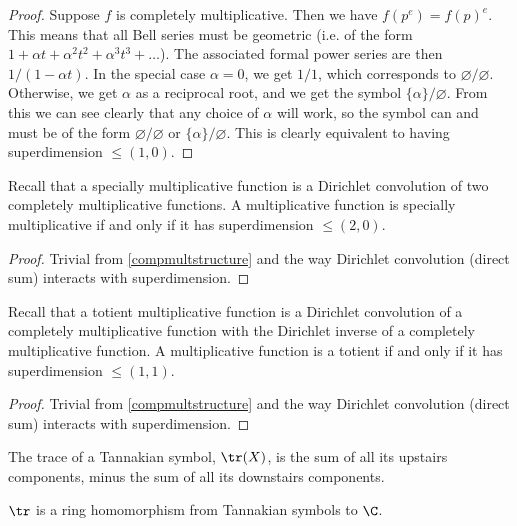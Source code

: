 \documentclass[a4paper]{article}
\begin{document}
\begin{proof}
Suppose $f$ is completely multiplicative. Then we have $f(p^e) = f(p)^e$. This means that all Bell series must be geometric (i.e. of the form $1 + \alpha t + \alpha^2 t^2 + \alpha^3 t^3 + \ldots$). The associated formal power series are then $1/(1 - \alpha t)$. In the special case $\alpha=0$, we get $1/1$, which corresponds to $\varnothing/\varnothing$. Otherwise, we get $\alpha$ as a reciprocal root, and we get the symbol $\{\alpha\}/\varnothing$. From this we can see clearly that any choice of $\alpha$ will work, so the symbol can and must be of the form $\varnothing/\varnothing$ or $\{\alpha\}/\varnothing$. This is clearly equivalent to having superdimension $\le (1, 0)$.
\end{proof}

\begin{proposition}
Recall that a specially multiplicative function is a Dirichlet convolution of two completely multiplicative functions. A multiplicative function is specially multiplicative if and only if it has superdimension $\le (2, 0)$.
\end{proposition}

\begin{proof}
Trivial from \ref{compmultstructure} and the way Dirichlet convolution (direct sum) interacts with superdimension.
\end{proof}

\begin{proposition}
Recall that a totient multiplicative function is a Dirichlet convolution of a completely multiplicative function with the Dirichlet inverse of a completely multiplicative function. A multiplicative function is a totient if and only if it has superdimension $\le (1, 1)$.
\end{proposition}

\begin{proof}
Trivial from \ref{compmultstructure} and the way Dirichlet convolution (direct sum) interacts with superdimension.
\end{proof}


\begin{definition}
The trace of a Tannakian symbol, $\tr(X)$, is the sum of all its upstairs components, minus the sum of all its downstairs components.
\end{definition}

\begin{proposition}
$\tr$ is a ring homomorphism from Tannakian symbols to $\C$.
\end{proposition}
\end{document}
